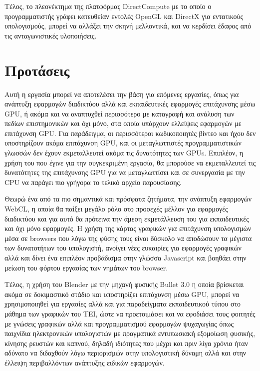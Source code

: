 Τέλος, το πλεονέκτημα της πλατφόρμας DirectCompute με το οποίο ο προγραμματιστής γράφει κατευθείαν εντολές OpenGL και DirectX για εντατικούς υπολογισμούς, μπορεί να αλλάξει την σκηνή μελλοντικά, και να κερδίσει έδαφος από τις ανταγωνιστικές υλοποιήσεις.
\section{Προτάσεις}
Αυτή η εργασία μπορεί να αποτελέσει την βάση για επόμενες εργασίες, όπως για ανάπτυξη εφαρμογών διαδικτύου αλλά και εκπαιδευτικές εφαρμογές επιτάχυνσης μέσω GPU, ή ακόμα και να αναπτυχθεί περισσότερο με καταγραφή και ανάλυση των πεδίων επιστημονικών και όχι μόνο, στα οποία υπάρχουν ελλείψεις εφαρμογών με επιτάχυνση GPU. Για παράδειγμα, οι περισσότεροι κωδικοποιητές βίντεο και ήχου δεν υποστηρίζουν ακόμα επιτάχυνση GPU, και οι μεταγλωττιστές προγραμματιστικών γλωσσών δεν έχουν εκμεταλλευτεί ακόμα τις δυνατότητες των GPUs. Επιπλέον, η χρήση του  που έγινε για την συγκεκριμένη εργασία, θα μπορούσε να εκμεταλλευτεί τις δυνατότητες της επιτάχυνσης GPU για να μεταγλωττίσει και σε συνεργασία με την CPU να παράγει πιο γρήγορα το τελικό αρχείο παρουσίασης.

Θεωρώ ένα από τα πιο σημαντικά και πρόσφατα ζητήματα, την ανάπτυξη εφαρμογών WebCL, η οποία θα παίξει μεγάλο ρόλο στο προσεχές μέλλον για εφαρμογές διαδικτύου και για αυτό θα πρότεινα την άμεση εκμετάλλευση του για εκπαιδευτικές και όχι μόνο εφαρμογές. Η χρήση της κάρτας γραφικών για επιτάχυνση υπολογισμών μέσα σε browsers που λόγω της φύσης τους είναι δύσκολο να αποδώσουν τα μέγιστα των δυνατοτήτων του υπολογιστή, ανοίγει νέες ευκαιρίες για εφαρμογές γραφικών αλλά και δίνει ένα επιπλέον προβάδισμα στην γλώσσα Javascript και βοηθάει στην μείωση του φόρτου εργασίας των νημάτων του browser.
 
Τέλος, η χρήση του Blender με την μηχανή φυσικής Bullet 3.0 η οποία βρίσκεται ακόμα σε δοκιμαστικό στάδιο και υποστηρίζει επιτάχυνση μέσω GPU, μπορεί να χρησιμοποιηθεί για εργασίες αλλά και για παραδείγματα εκπαιδευτικού τύπου στο μάθημα των γραφικών του ΤΕΙ, ώστε να προετοιμάσει και να εφοδιάσει τους φοιτητές με γνώσεις γραφικών αλλά και προγραμματισμού εφαρμογών ψυχαγωγίας όπως παιχνίδια ηλεκτρονικών υπολογιστών με πραγματικά εντυπωσιακή εξομοίωση φυσικής, κίνησης ρευστών και καπνού, δηλαδή ιδιότητες που μέχρι και πριν λίγα χρόνια ήταν αδύνατο να διδαχθούν λόγω περιορισμών στην υπολογιστική δύναμη αλλά και στην έλλειψη περιβαλλόντων ανάπτυξης ειδικών εφαρμογών.